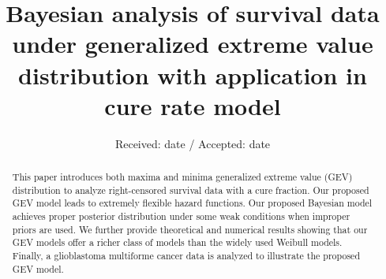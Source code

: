 \documentclass[smallextended]{svjour3}       %
\begin{document}
\title{Bayesian analysis of survival data under generalized extreme value distribution with application in cure rate model}


\author{
}

\authorrunning{} 

\institute{
}

\date{Received: date / Accepted: date}


\maketitle

\begin{abstract}
This paper introduces both maxima and minima generalized extreme value (GEV) distribution
to analyze right-censored survival data with a cure fraction. Our proposed GEV model leads to extremely flexible hazard functions. Our proposed Bayesian model achieves proper posterior distribution under some weak conditions when improper priors are used. We further provide theoretical and numerical results showing that our GEV models offer a richer class of models than the widely used Weibull models. Finally, a glioblastoma multiforme cancer data is analyzed to illustrate the proposed GEV model.
\end{abstract}
\end{document}
